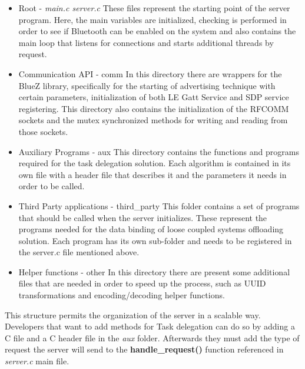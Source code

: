
\begin{itemize}

\item{Root - \textit{main.c server.c}}
	These files represent the starting point of the server program. Here, the main variables are initialized, checking is performed in order to see if Bluetooth can be enabled on the system and also contains the main loop that listens for connections and starts additional threads by request.

\item{Communication API - comm}
	In this directory there are wrappers for the BlueZ library, specifically for the starting of advertising technique with certain parameters, initialization of both LE Gatt Service and SDP service registering. This directory also contains the initialization of the RFCOMM sockets and the mutex synchronized methods for writing and reading from those sockets.

\item{Auxiliary Programs - aux}
	This directory contains the functions and programs required for the task delegation solution. Each algorithm is contained in its own file with a header file that describes it and the parameters it needs in order to be called.
	
\item{Third Party applications - third_party}
	This folder contains a set of programs that should be called when the server initializes. These represent the programs needed for the data binding of loose coupled systems offloading solution. Each program has its own sub-folder and needs to be registered in the server.c file mentioned above.
	
\item{Helper functions - other}
	In this directory there are present some additional files that are needed in order to speed up the process, such as UUID transformations and encoding/decoding helper functions.

\end{itemize}

This structure permits the organization of the server in a scalable way. Developers that want to add methods for Task delegation can do so by adding a C file and a C header file in the \textit{aux} folder. Afterwards they must add the type of request the server will send to the \textbf{handle_request()} function referenced in \textit{server.c} main file. 

